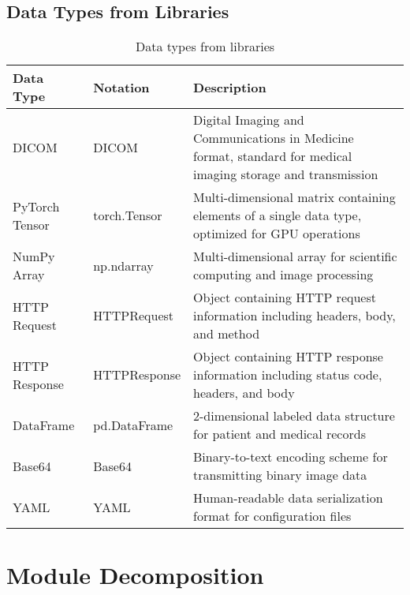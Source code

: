 \documentclass[12pt, titlepage]{article}
\begin{document}
\subsection{Data Types from Libraries}
\begin{table}[H]
    \centering
    \renewcommand{\arraystretch}{1.2}
    \noindent
    \begin{tabular}{l l p{7.5cm}}
    \toprule
    \textbf{Data Type} & \textbf{Notation} & \textbf{Description} \\
    \midrule
    DICOM & DICOM & Digital Imaging and Communications in Medicine format, standard for medical imaging storage and transmission \\
    PyTorch Tensor & torch.Tensor & Multi-dimensional matrix containing elements of a single data type, optimized for GPU operations \\
    NumPy Array & np.ndarray & Multi-dimensional array for scientific computing and image processing \\
    HTTP Request & HTTPRequest & Object containing HTTP request information including headers, body, and method \\
    HTTP Response & HTTPResponse & Object containing HTTP response information including status code, headers, and body \\
    DataFrame & pd.DataFrame & 2-dimensional labeled data structure for patient and medical records \\
    Base64 & Base64 & Binary-to-text encoding scheme for transmitting binary image data \\
    YAML & YAML & Human-readable data serialization format for configuration files \\
    \bottomrule
    \end{tabular}
    \caption{Data types from libraries}
    \end{table}

\newpage
\section{Module Decomposition}
\end{document}
